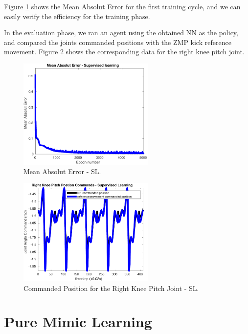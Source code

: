 Figure \ref{fig:SL_MAE} shows the Mean Absolut Error for the first training cycle, and we can easily verify the efficiency for the training phase.

In the evaluation phase, we ran an agent using the obtained NN as the policy, and compared the joints commanded positions with the ZMP kick reference movement. Figure \ref{fig:SL_cmd_pos} shows the corresponding data for the right knee pitch joint.

\begin{figure}[H]
    \centering
    \includegraphics[width=0.6\textwidth]{Chapter7/plots/plot_MAE_supervised.pdf} 
    \caption{Mean Absolut Error - SL.}
    \label{fig:SL_MAE}
\end{figure}

\begin{figure}[H]
    \centering
    \includegraphics[width=0.6\textwidth]{Chapter7/plots/plot_joints_pos_superv.pdf} 
    \caption{Commanded Position for the Right Knee Pitch Joint - SL.}
    \label{fig:SL_cmd_pos}
\end{figure}

\section{Pure Mimic Learning}

